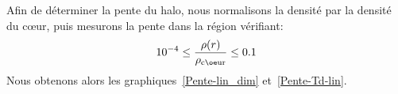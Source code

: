 

				Afin de déterminer la pente du halo, nous
				normalisons la densité par la densité du cœur, puis mesurons la
				pente dans la région vérifiant:
				\begin{align*}
					10^{-4} \leq \dfrac{\rho(r)}{\rho_\mathrm{c\oe ur}} \leq 0.1
				\end{align*}
				Nous obtenons alors les graphiques~\ref{Pente-lin_dim} et~\ref{Pente-Td-lin}.



